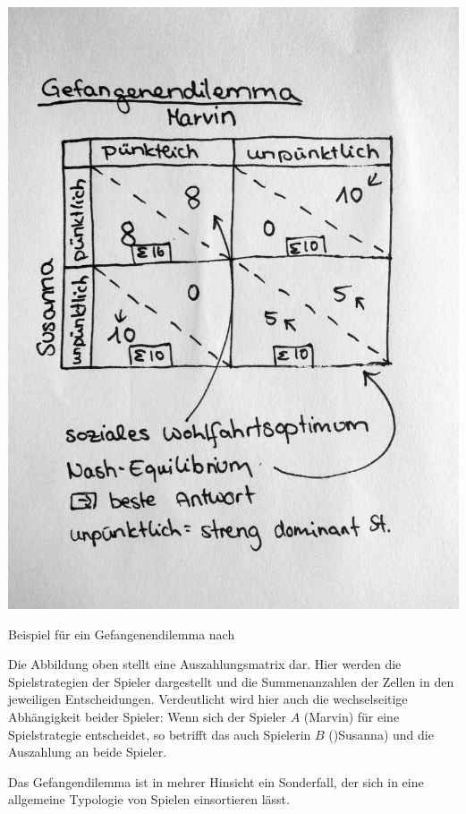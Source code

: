 \begin{dsafigure}
	\begin{center}
	\includegraphics[width=0.9\columnwidth]{img/gefangendilemma.jpg}
	\caption{Beispiel für ein Gefangenendilemma nach \cite{Kleinberg-2009-oz}}
	\label{fig:gefangenendilemma}
	\end{center}
\end{dsafigure}

Die Abbildung oben stellt eine Auszahlungsmatrix dar.
Hier werden die Spielstrategien der Spieler dargestellt und die Summenanzahlen der Zellen in den jeweiligen Entscheidungen.
Verdeutlicht wird hier auch die wechselseitige Abhängigkeit beider Spieler: Wenn sich der Spieler $A$ (Marvin) für eine Spielstrategie entscheidet, so betrifft das auch Spielerin $B$ ()Susanna) und die Auszahlung an beide Spieler.

Das Gefangendilemma ist in mehrer Hinsicht ein Sonderfall, der sich in eine allgemeine Typologie von Spielen einsortieren lässt.

